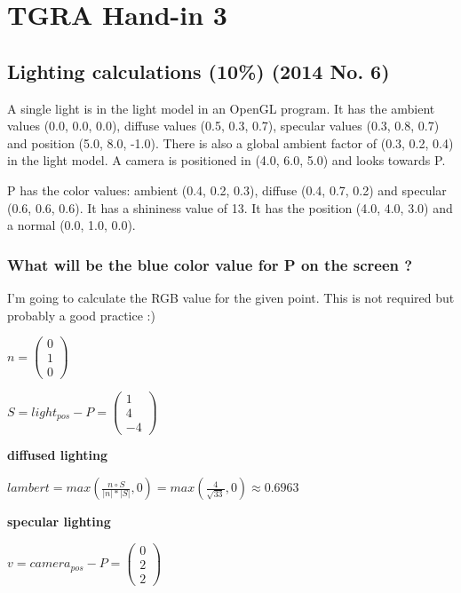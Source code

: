 \section{TGRA Hand-in 3}

\subsection{Lighting calculations (10\%) (2014 No. 6)}
A single light is in the light model in an OpenGL program. It has the ambient values (0.0, 0.0, 0.0), diffuse values (0.5, 0.3, 0.7), specular values (0.3, 0.8, 0.7) and position (5.0, 8.0, -1.0). There is also a global ambient factor of (0.3, 0.2, 0.4) in the light model. A camera is positioned in (4.0, 6.0, 5.0) and looks towards P.

P has the color values: ambient (0.4, 0.2, 0.3), diffuse (0.4, 0.7, 0.2) and specular (0.6, 0.6, 0.6). It has a shininess value of 13. It has the position (4.0, 4.0, 3.0) and a normal (0.0, 1.0, 0.0).

\subsubsection{What will be the blue color value for P on the screen ?}
I'm going to calculate the RGB value for the given point. This is not required but probably a good practice :)

$
    n
=
    \left(\begin{array}{c}
        0\\
        1\\
        0
    \end{array}\right)
$

$
    S
=
    light_{pos}
    -
    P
=
    \left(\begin{array}{c}
        1\\
        4\\
        -4
    \end{array}\right)
$

\textbf{diffused lighting}

$
    lambert
=
    max\left(
        \frac{
            n
            \circ
            S
        }{
            | n | * | S |
        }
        , 
        0
    \right)
=
    max\left(
        \frac{4}{\sqrt{33}}
        ,
        0
    \right)
\approx
    0.6963
$

\textbf{specular lighting}

$
    v
=
    camera_{pos}
    -
    P
=
    \left(\begin{array}{c}
        0\\
        2\\
        2
    \end{array}\right)
$

